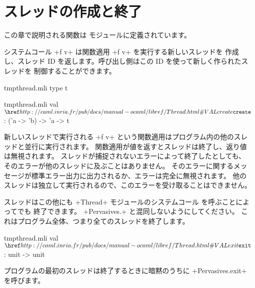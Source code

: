 \section{スレッドの作成と終了}

この章で説明される関数は  モジュールに定義されています。

システムコール  \ml+f v+ は関数適用 \ml+f v+ を実行する新しいスレッドを
作成し、スレッド ID を返します。呼び出し側はこの ID を使って新しく作られたスレッドを
制御することができます。
%
\begin{codefile}{tmpthread.mli}
type t
\end{codefile}
%
\begin{listingcodefile}{tmpthread.mli}
val $\libvalue{Thread}{create}$ : ('a -> 'b) -> 'a -> t
\end{listingcodefile}
%
新しいスレッドで実行される \ml+f v+ という関数適用はプログラム内の他のスレッドと並行に実行されます。
関数適用が値を返すとスレッドは終了し、返り値は無視されます。
スレッドが捕捉されないエラーによって終了したとしても、
そのエラーが他のスレッドに及ぶことはありません。
そのエラーに関するメッセージが標準エラー出力に出力されるか、エラーは完全に無視されます。
他のスレッドは独立して実行されるので、このエラーを受け取ることはできません。

スレッドはこの他にも \ml+Thread+ モジュールのシステムコール  を呼ぶことによってでも
終了できます。 \ml+Pervasives.+ と混同しないようにしてください。
これはプログラム全体、つまり全てのスレッドを終了します。
%
\begin{listingcodefile}{tmpthread.mli}
val $\indexlibvalue{Thread}{exit}$ : unit -> unit
\end{listingcodefile}
%
プログラムの最初のスレッドは終了するときに暗黙のうちに \ml+Pervasives.exit+ を呼びます。

